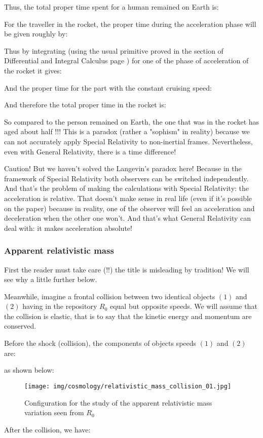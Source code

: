 	
	Thus, the total proper time spent for a human remained on Earth is:
	
	For the traveller in the rocket, the proper time during the acceleration phase will be given roughly by:
	
	Thus by integrating (using the usual primitive proved in the section of Differential and Integral Calculus page \pageref{usual primitives}) for one of the phase of acceleration of the rocket it gives:
	
	And the proper time for the part with the constant cruising speed:
	
	And therefore the total proper time in the rocket is:
	
	So compared to the person remained on Earth, the one that was in the rocket has aged about half !!! This is a paradox (rather a "sophism" in reality) because we can not accurately apply Special Relativity to non-inertial frames. Nevertheless, even with General Relativity, there is a time difference!
	
	\begin{tcolorbox}[colback=red!5,borderline={1mm}{2mm}{red!5},arc=0mm,boxrule=0pt]
	\bcbombe Caution! But we haven't solved the Langevin's paradox here! Because in the framework of Special Relativity both observers can be switched independently. And that's the problem of making the calculations with Special Relativity: the acceleration is relative. That doesn't make sense in real life (even if it's possible on the paper) because in reality, one of the observer will feel an acceleration and deceleration when the other one won't. And that's what General Relativity can deal with: it makes acceleration absolute!
	\end{tcolorbox}
	
	\subsubsection{Apparent relativistic mass}
	First the reader must take care (!!) the title is misleading by tradition! We will see why a little further below.

	Meanwhile, imagine a frontal collision between two identical objects $(1)$ and $(2)$ having in the repository $R_0$ equal but opposite speeds. We will assume that the collision is elastic, that is to say that the kinetic energy and momentum are conserved.

	Before the shock (collision), the components of objects speeds $(1)$ and $(2)$ are:
	
	as shown below:
	\begin{figure}[H]
		\centering
		\texttt{[image: img/cosmology/relativistic\_mass\_collision\_01.jpg]}
		\caption{Configuration for the study of the apparent relativistic mass variation seen from $R_0$}
	\end{figure}
	After the collision, we have:
	
